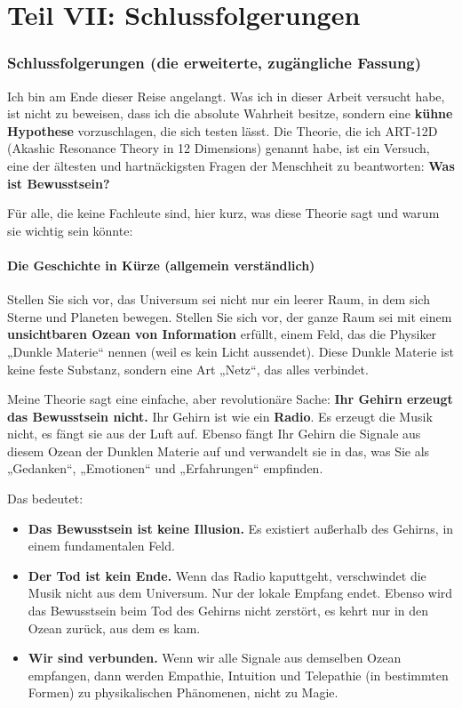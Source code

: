 \part*{Teil VII: Schlussfolgerungen}

\section{Schlussfolgerungen (die erweiterte, zugängliche Fassung)}
Ich bin am Ende dieser Reise angelangt. Was ich in dieser Arbeit versucht habe, ist nicht zu beweisen, dass ich die absolute Wahrheit besitze, sondern eine \textbf{kühne Hypothese} vorzuschlagen, die sich testen lässt. Die Theorie, die ich ART-12D (Akashic Resonance Theory in 12 Dimensions) genannt habe, ist ein Versuch, eine der ältesten und hartnäckigsten Fragen der Menschheit zu beantworten: \textbf{Was ist Bewusstsein?}

Für alle, die keine Fachleute sind, hier kurz, was diese Theorie sagt und warum sie wichtig sein könnte:

\subsection{Die Geschichte in Kürze (allgemein verständlich)}
Stellen Sie sich vor, das Universum sei nicht nur ein leerer Raum, in dem sich Sterne und Planeten bewegen. Stellen Sie sich vor, der ganze Raum sei mit einem \textbf{unsichtbaren Ozean von Information} erfüllt, einem Feld, das die Physiker „Dunkle Materie`` nennen (weil es kein Licht aussendet). Diese Dunkle Materie ist keine feste Substanz, sondern eine Art „Netz``, das alles verbindet.

Meine Theorie sagt eine einfache, aber revolutionäre Sache: \textbf{Ihr Gehirn erzeugt das Bewusstsein nicht.} Ihr Gehirn ist wie ein \textbf{Radio}. Es erzeugt die Musik nicht, es fängt sie aus der Luft auf. Ebenso fängt Ihr Gehirn die Signale aus diesem Ozean der Dunklen Materie auf und verwandelt sie in das, was Sie als „Gedanken``, „Emotionen`` und „Erfahrungen`` empfinden.

Das bedeutet:
\begin{itemize}
    \item \textbf{Das Bewusstsein ist keine Illusion.} Es existiert außerhalb des Gehirns, in einem fundamentalen Feld.
    \item \textbf{Der Tod ist kein Ende.} Wenn das Radio kaputtgeht, verschwindet die Musik nicht aus dem Universum. Nur der lokale Empfang endet. Ebenso wird das Bewusstsein beim Tod des Gehirns nicht zerstört, es kehrt nur in den Ozean zurück, aus dem es kam.
    \item \textbf{Wir sind verbunden.} Wenn wir alle Signale aus demselben Ozean empfangen, dann werden Empathie, Intuition und Telepathie (in bestimmten Formen) zu physikalischen Phänomenen, nicht zu Magie.
\end{itemize}

